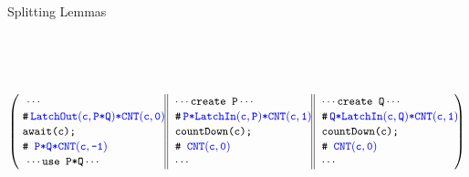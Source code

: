 \begin{frame}[shrink=17]{Splitting Lemmas}
\pause
\begin{center}
\begin{small}
 \\
 \\
 \\\vspace{-12pt}
\[
\left(
\begin{tabular}{ 
  l@{\extracolsep{\fill}} || 
  l@{\extracolsep{\fill}} || 
  l@{\extracolsep{\fill}} }
\code{\dotonly{}} & \code{\dotsaying{create P}} & \code{\dotsaying{create Q}}\\
\!\!\code{\CSPEC{\!\!\LatchOut{c}{P{\sep}Q}{\sep}\CNT{c}{0}}}
& \code{\CSPEC{\!\!P{\sep}\LatchIn{c}{P}{\sep}\CNT{c}{1}}} 
& \code{\CSPEC{\!\!Q{\sep}\LatchIn{c}{Q}{\sep}\CNT{c}{1}}} \\
\!\!\code{await(c);} & \code{countDown(c);} & \code{countDown(c);}\\
\!\!\code{\CSPEC{{P{\sep}Q{\sep}\CNT{c}{-1}}}}
& \code{\CSPEC{\CNT{c}{0}}} 
& \code{\CSPEC{\CNT{c}{0}}} \\
\code{\dotsaying{use P*Q}} & \code{\dotonly{}} & \code{\dotonly{}} \\
\end{tabular}\!\!\right)%
\]
\end{small}
\end{center}

\end{frame}

